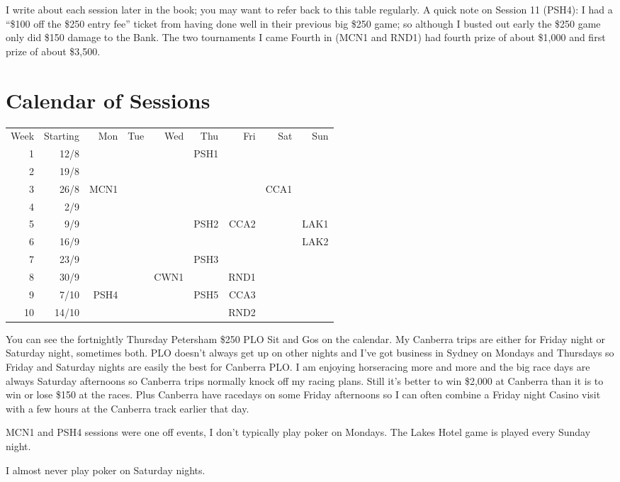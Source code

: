 I write about each session later in the book; you may want to
refer back to this table regularly. A quick note on Session 11 (PSH4): I had
a ``\$100 off the \$250 entry fee'' ticket from having done well in
their previous big \$250 game; so although I busted out early the \$250
game only did \$150 damage to the Bank. The two tournaments I came
Fourth in (MCN1 and RND1) had fourth prize of about \$1,000 and first
prize of about \$3,500.

\section*{Calendar of Sessions}

\begin{tabular}{rrrrrrrrr}
  Week & Starting & Mon & Tue & Wed & Thu & Fri & Sat & Sun \\
  1 & 12/8  &     &     &     & PSH1 &     &     &     \\
  2 & 19/8  &     &     &     &      &     &     &     \\
  3 & 26/8  & MCN1 &    &     &      &     & CCA1 &    \\
  4 & 2/9  &      &    &     &      &     &     &     \\
  5 &  9/9  &     &     &     & PSH2 & CCA2&     & LAK1\\
  6 & 16/9  &     &     &     &      &     &     & LAK2\\
  7 & 23/9  &     &     &     & PSH3 &     &     &     \\
  8 & 30/9  &     &     & CWN1&      & RND1&     &     \\
  9 & 7/10 & PSH4 &    &     & PSH5 & CCA3&     &     \\
 10 & 14/10 &     &     &     &      & RND2&     &     \\
\end{tabular}

You can see the fortnightly Thursday Petersham \$250 PLO Sit and Gos
on the calendar. My Canberra trips are either for Friday night or
Saturday night, sometimes both. PLO doesn't always get up on other
nights and I've got business in Sydney on Mondays and Thursdays so
Friday and Saturday nights are easily the best for Canberra PLO. I
am enjoying horseracing more and more and the big race days are always
Saturday afternoons so Canberra trips normally knock off my racing
plans. Still it's better to win \$2,000 at Canberra than it is to win
or lose \$150 at the races. Plus Canberra have racedays on some Friday
afternoons so I can often combine a Friday night Casino visit with a
few hours at the Canberra track earlier that day.

MCN1 and PSH4 sessions were one off events, I don't typically play
poker on Mondays. The Lakes Hotel game is played every Sunday night.

I almost never play poker on Saturday nights.
